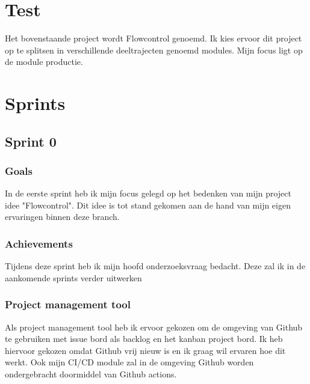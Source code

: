\documentclass[11pt, twoside]{report}
\begin{document}
    \chapter{Test}
    \label{ch:test}
    \newline

    Het bovenstaande project wordt Flowcontrol genoemd. Ik kies ervoor dit project op te splitsen in verschillende
    deeltrajecten genoemd modules. Mijn focus ligt op de module productie.

    \newpage

    \chapter{Sprints}
    \label{ch:sprints}

    \section{Sprint 0}
    \label{sec:sprint-0}

    \subsection{Goals}
    \label{subsec:goals}
    In de eerste sprint heb ik mijn focus gelegd op het bedenken van mijn project idee "Flowcontrol".
    Dit idee is tot stand gekomen aan de hand van mijn eigen ervaringen binnen deze branch.

    \subsection{Achievements}\label{subsec:achievements}
    Tijdens deze sprint heb ik mijn hoofd onderzoeksvraag bedacht. Deze zal ik in de aankomende sprints verder uitwerken

    \subsection{Project management tool}\label{subsec:project-management-tool}
    Als project management tool heb ik ervoor gekozen om de omgeving van Github te gebruiken met issue bord als
    backlog en het kanban project bord.
    Ik heb hiervoor gekozen omdat Github vrij nieuw is en ik graag wil ervaren hoe dit werkt.
    Ook mijn CI/CD module zal in de omgeving Github worden ondergebracht doormiddel van Github actions.
\end{document}
